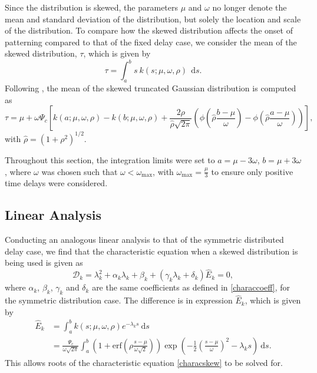 Since the distribution is skewed, the parameters $\mu$ and $\omega$ no longer denote the mean and standard deviation of the distribution, but solely the location and scale of the distribution. To compare how the skewed distribution affects the onset of patterning compared to that of the fixed delay case, we consider the mean of the skewed distribution, $\tau$, which is given by
\begin{equation}\label{anmean}
    \tau=\int_a^bs\ k(s;\mu,\omega,\rho)\ \ \text{d}s.
\end{equation}
Following \cite{skewed}, the mean of the skewed truncated Gaussian distribution is computed as
\begin{equation}\label{computetau}
\tau=\mu+\omega\Psi_c\left[k(a;\mu,\omega,\rho)-k(b;\mu,\omega,\rho)+\frac{2\rho}{\hat{\rho}\sqrt{2\pi}}\left(\phi\left(\hat{\rho}\frac{b-\mu}{\omega}\right)-\phi\left(\hat{\rho}\frac{a-\mu}{\omega}\right)\right)\right],
\end{equation}
with $\hat{\rho}=\left(1+\rho^2\right)^{1/2}$. 

Throughout this section, the integration limits were set to $a=\mu-3\omega$, $b=\mu+3\omega$, where $\omega$ was chosen such that $\omega<\omega_{\max}$, with $\omega_{\max}=\frac{\mu}{3}$ to ensure only positive time delays were considered.
\subsection{Linear Analysis}\label{section:linanalskew}
Conducting an analogous linear analysis to that of the symmetric distributed delay case, we find that the characteristic equation when a skewed distribution is being used is given as
\begin{equation}\label{characskew}
  \mathcal{D}_k=\lambda_k^2+\alpha_k\lambda_k+\beta_k+(\gamma_k\lambda_k+\delta_k)\hat{E}_k=0,
\end{equation}
where $\alpha_k$, $\beta_k$, $\gamma_k$ and $\delta_k$ are the same coefficients as defined in \eqref{characcoeff}, for the symmetric distribution case. The difference is in expression $\hat{E}_k$, which is given by
\begin{equation}\label{Ehat}
    \begin{split}
\hat{E}_k&=\int_a^bk(s;\mu,\omega,\rho)e^{-\lambda_k s}\ \text{d}s\\
&=\frac{\Psi_c}{\omega\sqrt{2\pi}}\int_a^b\left(1+\text{erf}\left(\rho\frac{s-\mu}{\omega\sqrt{2}}\right)\right)\exp\left(-\frac{1}{2}\left(\frac{s-\mu}{\omega}\right)^2-\lambda_ks\right)\ \text{d}s.
    \end{split}
\end{equation}
 This allows roots of the characteristic equation \eqref{characskew} to be solved for.

